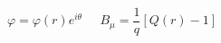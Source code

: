 \begin{equation}
\varphi = \varphi(r)e^{i\theta} \;\;\;\;\; B_{\mu}= \frac{1}{q}[Q(r)-1]
\end{equation}

